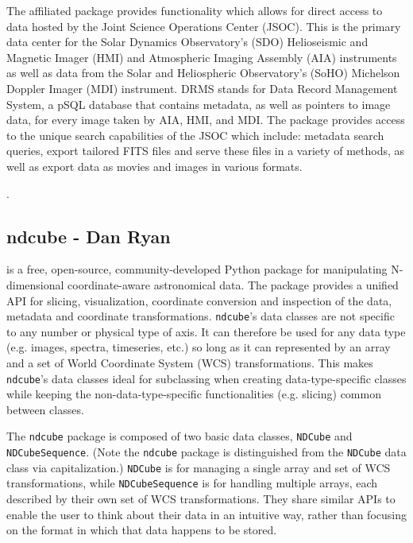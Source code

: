 The  affiliated package provides functionality which allows for direct access to data hosted by the Joint Science Operations Center (JSOC). This is the primary data center for the Solar Dynamics Observatory’s (SDO) Helioseismic and Magnetic Imager (HMI) and Atmospheric Imaging Assembly (AIA) instruments as well as data from the Solar and Heliospheric Observatory's (SoHO) Michelson Doppler Imager (MDI) instrument. DRMS stands for Data Record Management System, a pSQL database that contains metadata, as well as pointers to image data, for every image taken by AIA, HMI, and MDI. The  package provides access to the unique search capabilities of the JSOC which include: metadata search queries, export tailored FITS files and serve these files in a variety of methods, as well as export data as movies and images in various formats.

.

\subsection{ndcube - Dan Ryan}
 is a free, open-source, community-developed Python package for manipulating N-dimensional coordinate-aware astronomical data.
The package provides a unified API for slicing, visualization, coordinate conversion and inspection of the data, metadata and coordinate transformations.
\texttt{ndcube}'s data classes are not specific to any number or physical type of axis.
It can therefore be used for any data type (e.g. images, spectra, timeseries, etc.) so long as it can represented by an array and a set of World Coordinate System (WCS) transformations.
This makes \texttt{ndcube}'s data classes ideal for subclassing when creating data-type-specific classes while keeping the non-data-type-specific functionalities (e.g. slicing) common between classes.

The \texttt{ndcube} package is composed of two basic data classes, \texttt{NDCube} and \texttt{NDCubeSequence}.
(Note the \texttt{ndcube} package is distinguished from the \texttt{NDCube} data class via capitalization.)
\texttt{NDCube} is for managing a single array and set of WCS transformations, while \texttt{NDCubeSequence} is for handling multiple arrays, each described by their own set of WCS transformations.
They share similar APIs to enable the user to think about their data in an intuitive way, rather than focusing on the format in which that data happens to be stored.


